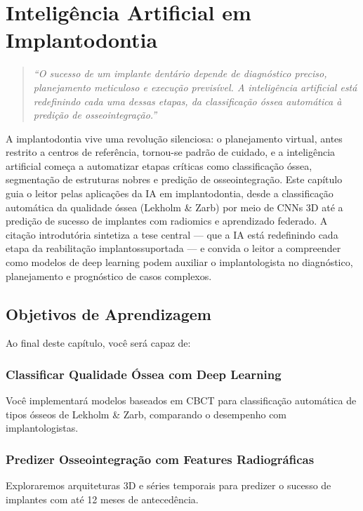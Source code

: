 \chapter{Inteligência Artificial em Implantodontia}
\label{cap:implantodontia-ia}
\niveltres

\begin{quote}
\textit{``O sucesso de um implante dentário depende de diagnóstico preciso, planejamento meticuloso e execução previsível. A inteligência artificial está redefinindo cada uma dessas etapas, da classificação óssea automática à predição de osseointegração.''}
\end{quote}

A implantodontia vive uma revolução silenciosa: o planejamento virtual, antes restrito a centros de referência, tornou-se padrão de cuidado, e a inteligência artificial começa a automatizar etapas críticas como classificação óssea, segmentação de estruturas nobres e predição de osseointegração. Este capítulo guia o leitor pelas aplicações da IA em implantodontia, desde a classificação automática da qualidade óssea (Lekholm \& Zarb) por meio de CNNs 3D até a predição de sucesso de implantes com radiomics e aprendizado federado. A citação introdutória sintetiza a tese central --- que a IA está redefinindo cada etapa da reabilitação implantossuportada --- e convida o leitor a compreender como modelos de deep learning podem auxiliar o implantologista no diagnóstico, planejamento e prognóstico de casos complexos.

\section{Objetivos de Aprendizagem}

Ao final deste capítulo, você será capaz de:

\subsection{Classificar Qualidade Óssea com Deep Learning}
Você implementará modelos baseados em CBCT para classificação automática de tipos ósseos de Lekholm \& Zarb, comparando o desempenho com implantologistas.

\subsection{Predizer Osseointegração com Features Radiográficas}
Exploraremos arquiteturas 3D e séries temporais para predizer o sucesso de implantes com até 12 meses de antecedência.

